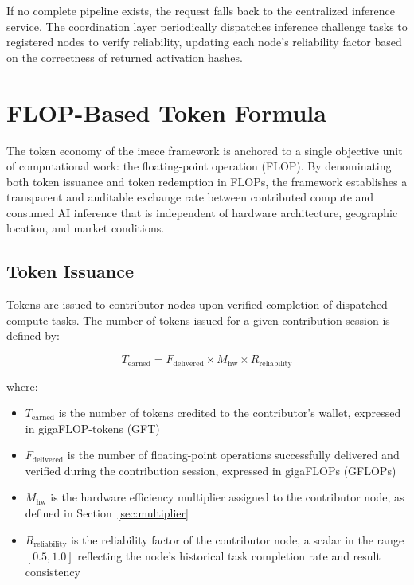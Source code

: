 \documentclass[12pt]{article}
\begin{document}
If no complete pipeline exists, the request falls back to the centralized inference service. The coordination layer periodically dispatches inference challenge tasks to registered nodes to verify reliability, updating each node's reliability factor based on the correctness of returned activation hashes.

\section{FLOP-Based Token Formula}
\label{sec:token}

The token economy of the imece framework is anchored to a single objective unit of computational work: the floating-point operation (FLOP). By denominating both token issuance and token redemption in FLOPs, the framework establishes a transparent and auditable exchange rate between contributed compute and consumed AI inference that is independent of hardware architecture, geographic location, and market conditions.

\subsection{Token Issuance}

Tokens are issued to contributor nodes upon verified completion of dispatched compute tasks. The number of tokens issued for a given contribution session is defined by:

\begin{equation}
T_{\text{earned}} = F_{\text{delivered}} \times M_{\text{hw}} \times R_{\text{reliability}}
\label{eq:issuance}
\end{equation}

where:
\begin{itemize}
    \item $T_{\text{earned}}$ is the number of tokens credited to the contributor's wallet, expressed in gigaFLOP-tokens (GFT)
    \item $F_{\text{delivered}}$ is the number of floating-point operations successfully delivered and verified during the contribution session, expressed in gigaFLOPs (GFLOPs)
    \item $M_{\text{hw}}$ is the hardware efficiency multiplier assigned to the contributor node, as defined in Section~\ref{sec:multiplier}
    \item $R_{\text{reliability}}$ is the reliability factor of the contributor node, a scalar in the range $[0.5, 1.0]$ reflecting the node's historical task completion rate and result consistency
\end{itemize}
\end{document}
